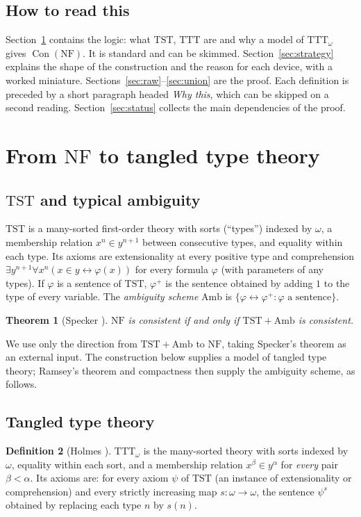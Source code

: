 \documentclass[11pt]{article}
\newtheorem{theorem}{Theorem}[section]
\theoremstyle{definition}
\newtheorem{definition}[theorem]{Definition}
\theoremstyle{remark}
\newcommand{\NF}{\mathrm{NF}}
\newcommand{\TTT}{\mathrm{TTT}}
\newcommand{\TST}{\mathrm{TST}}
\newcommand{\Amb}{\mathrm{Amb}}
\newcommand{\Con}{\operatorname{Con}}
\begin{document}
\subsection{How to read this}
Section~\ref{sec:logic} contains the logic: what \(\TST\), \(\TTT\) are
and why a model of \(\TTT_\omega\) gives \(\Con(\NF)\). It is standard and
can be skimmed. Section~\ref{sec:strategy} explains the shape of the
construction and the reason for each device, with a worked miniature.
Sections~\ref{sec:raw}--\ref{sec:union} are the proof. Each definition is
preceded by a short paragraph headed \emph{Why this}, which can be skipped
on a second reading. Section~\ref{sec:status} collects the main dependencies of the proof.

\section{From \texorpdfstring{\(\NF\)}{NF} to tangled type theory}
\label{sec:logic}

\subsection{\texorpdfstring{\(\TST\)}{TST} and typical ambiguity}
\(\TST\) is a many-sorted first-order theory with sorts (``types'')
indexed by \(\omega\), a membership relation \(x^n\in y^{n+1}\) between
consecutive types, and equality within each type. Its axioms are
extensionality at every positive type and comprehension
\(\exists y^{n+1}\forall x^n(x\in y\leftrightarrow\varphi(x))\) for every
formula \(\varphi\) (with parameters of any types). If \(\varphi\) is a
sentence of \(\TST\), \(\varphi^+\) is the sentence obtained by adding
\(1\) to the type of every variable. The \emph{ambiguity scheme} \(\Amb\)
is \(\{\varphi\leftrightarrow\varphi^+:\varphi\text{ a sentence}\}\).

\begin{theorem}[Specker \cite{Specker62}]\label{thm:specker}
\(\NF\) is consistent if and only if \(\TST+\Amb\) is consistent.
\end{theorem}

We use only the direction from \(\TST+\Amb\) to \(\NF\), taking
Specker's theorem as an external input. The construction below supplies
a model of tangled type theory; Ramsey's theorem and compactness then
supply the ambiguity scheme, as follows.

\subsection{Tangled type theory}
\begin{definition}[Holmes \cite{Holmes95}]
\(\TTT_\omega\) is the many-sorted theory with sorts indexed by \(\omega\),
equality within each sort, and a membership relation \(x^\beta\in y^\alpha\)
for \emph{every} pair \(\beta<\alpha\). Its axioms are: for every axiom
\(\psi\) of \(\TST\) (an instance of extensionality or comprehension) and
every strictly increasing map \(s:\omega\to\omega\), the sentence
\(\psi^{s}\) obtained by replacing each type \(n\) by \(s(n)\).
\end{definition}
\end{document}
